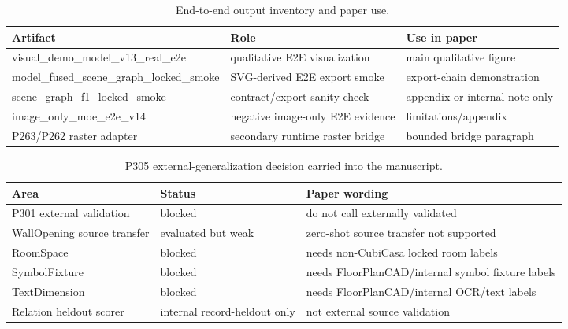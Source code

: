\begin{table}[t]
\centering
\small
\caption{End-to-end output inventory and paper use.}
\label{tab:p307_e2e_inventory}
\begin{tabular}{lll}
\toprule
Artifact & Role & Use in paper \\
\midrule
visual\_demo\_model\_v13\_real\_e2e & qualitative E2E visualization & main qualitative figure \\
model\_fused\_scene\_graph\_locked\_smoke & SVG-derived E2E export smoke & export-chain demonstration \\
scene\_graph\_f1\_locked\_smoke & contract/export sanity check & appendix or internal note only \\
image\_only\_moe\_e2e\_v14 & negative image-only E2E evidence & limitations/appendix \\
P263/P262 raster adapter & secondary runtime raster bridge & bounded bridge paragraph \\
\bottomrule
\end{tabular}
\end{table}

\begin{table}[t]
\centering
\small
\caption{P305 external-generalization decision carried into the manuscript.}
\label{tab:p305_external_generalization}
\begin{tabular}{lll}
\toprule
Area & Status & Paper wording \\
\midrule
P301 external validation & blocked & do not call externally validated \\
WallOpening source transfer & evaluated but weak & zero-shot source transfer not supported \\
RoomSpace & blocked & needs non-CubiCasa locked room labels \\
SymbolFixture & blocked & needs FloorPlanCAD/internal symbol fixture labels \\
TextDimension & blocked & needs FloorPlanCAD/internal OCR/text labels \\
Relation heldout scorer & internal record-heldout only & not external source validation \\
\bottomrule
\end{tabular}
\end{table}
